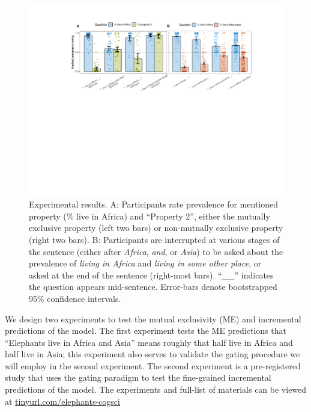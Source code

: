 \documentclass[letterpaper, 12pt]{article}
\begin{document}
\begin{figure}[t]
  \begin{center}
    \includegraphics[width=\textwidth]{xprag}
  \end{center}
  \vspace{-0.45cm}
  \caption{\small Experimental results. A: Participants rate prevalence for mentioned property (\% live in Africa) and ``Property 2'', either the mutually exclusive property (left two bars) or non-mutually exclusive property (right two bars).  B: Participants are interrupted at various stages of the sentence (either after \emph{Africa}, \emph{and}, or \emph{Asia}) to be asked about the prevalence of \emph{living in Africa} and \emph{living in some other place}, or asked at the end of the sentence (right-most bars). ``\_\_'' indicates the question appears mid-sentence. Error-bars denote bootstrapped 95\% confidence intervals.}
  \label{fig:results}
\end{figure}

We design two experiments to test the mutual exclusivity (ME) and incremental predictions of the model. 
The first experiment tests the ME predictions that ``Elephants live in Africa and Asia'' means roughly that half live in Africa and half live in Asia; this experiment also serves to validate the gating procedure we will employ in the second experiment. 
The second experiment is a pre-registered study that uses the gating paradigm to test the fine-grained incremental predictions of the model.
The experiments and full-list of materials can be viewed at \url{tinyurl.com/elephants-cogsci}
\end{document}
